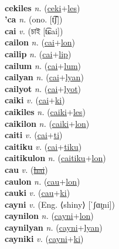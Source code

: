  \label{ceki} \\
\textbf{cekiles} \textit{n.} (\hyperref[ceki]{ceki}+\hyperref[les]{les})
 \label{cekiles} \\
\textbf{'ca} \textit{n.} (ono. [t͡ʃ])
 \label{'ca} \\
\textbf{cai} \textit{v.} ({\bengali{}চাই} [t͡ɕai])
 \label{cai} \\
\textbf{cailon} \textit{n.} (\hyperref[cai]{cai}+\hyperref[lon]{lon})
 \label{cailon} \\
\textbf{cailip} \textit{n.} (\hyperref[cai]{cai}+\hyperref[lip]{lip})
 \label{cailip} \\
\textbf{cailum} \textit{n.} (\hyperref[cai]{cai}+\hyperref[lum]{lum})
 \label{cailum} \\
\textbf{cailyan} \textit{n.} (\hyperref[cai]{cai}+\hyperref[lyan]{lyan})
 \label{cailyan} \\
\textbf{cailyot} \textit{n.} (\hyperref[cai]{cai}+\hyperref[lyot]{lyot})
 \label{cailyot} \\
\textbf{caiki} \textit{v.} (\hyperref[cai]{cai}+\hyperref[ki]{ki})
 \label{caiki} \\
\textbf{caikiles} \textit{n.} (\hyperref[caiki]{caiki}+\hyperref[les]{les})
 \label{caikiles} \\
\textbf{caikilon} \textit{n.} (\hyperref[caiki]{caiki}+\hyperref[lon]{lon})
 \label{caikilon} \\
\textbf{caiti} \textit{v.} (\hyperref[cai]{cai}+\hyperref[ti]{ti})
 \label{caiti} \\
\textbf{caitiku} \textit{v.} (\hyperref[cai]{cai}+\hyperref[tiku]{tiku})
 \label{caitiku} \\
\textbf{caitikulon} \textit{n.} (\hyperref[caitiku]{caitiku}+\hyperref[lon]{lon})
 \label{caitikulon} \\
\textbf{cau} \textit{v.} (\hyperref[hai]{\sout{hai}})
 \label{cau} \\
\textbf{caulon} \textit{n.} (\hyperref[cau]{cau}+\hyperref[lon]{lon})
 \label{caulon} \\
\textbf{cauki} \textit{v.} (\hyperref[cau]{cau}+\hyperref[ki]{ki})
 \label{cauki} \\
\textbf{cayni} \textit{v.} (Eng. ⟨shiny⟩ [ˈʃɑɪ̯ni])
 \label{cayni} \\
\textbf{caynilon} \textit{n.} (\hyperref[cayni]{cayni}+\hyperref[lon]{lon})
 \label{caynilon} \\
\textbf{caynilyan} \textit{n.} (\hyperref[cayni]{cayni}+\hyperref[lyan]{lyan})
 \label{caynilyan} \\
\textbf{cayniki} \textit{v.} (\hyperref[cayni]{cayni}+\hyperref[ki]{ki})
